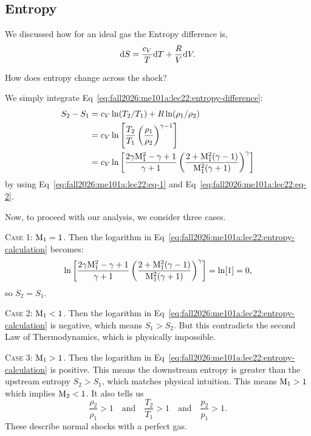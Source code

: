\subsection{Entropy}

\begin{recall}
We discussed how for an ideal gas the Entropy difference is,
\begin{equation}\label{eq:fall2026:me101a:lec22:entropy-difference}
\mathrm{d} S = \frac{c_{V}}{T}\mathrm{d} T + \frac{R}{V}\mathrm{d} V.
\end{equation}
\end{recall}

\begin{puzzle}
How does entropy change across the shock?
\end{puzzle}

\begin{node}
We simply integrate Eq~\eqref{eq:fall2026:me101a:lec22:entropy-difference}:
\begin{subequations}\label{eq:fall2026:me101a:lec22:entropy-calculation}
  \begin{align}
S_{2} - S_{1}
&= c_{V}\ln(T_{2}/T_{1})+R\ln(\rho_{1}/\rho_{2})\\
&= c_{V}\ln\left[\frac{T_{2}}{T_{1}}\left(\frac{\rho_{1}}{\rho_{2}}\right)^{\gamma-1}\right]\\
&= c_{V}\ln\left[\frac{2\gamma\mathrm{M}_{1}^{2}-\gamma+1}{\gamma+1}\left(\frac{2+\mathrm{M}_{1}^{2}(\gamma-1)}{\mathrm{M}_{1}^{2}(\gamma+1)}\right)^{\gamma}\right]
  \end{align}
\end{subequations}
by using Eq~\eqref{eq:fall2026:me101a:lec22:eq-1} and Eq~\eqref{eq:fall2026:me101a:lec22:eq-2}.
\end{node}

\begin{node}
Now, to proceed with our analysis, we consider three cases.

\textsc{Case 1}: $\mathrm{M}_{1}=1$. Then the logarithm in Eq~\eqref{eq:fall2026:me101a:lec22:entropy-calculation}
becomes:
\begin{equation}
\ln\left[\frac{2\gamma\mathrm{M}_{1}^{2}-\gamma+1}{\gamma+1}\left(\frac{2+\mathrm{M}_{1}^{2}(\gamma-1)}{\mathrm{M}_{1}^{2}(\gamma+1)}\right)^{\gamma}\right]=\ln[1]=0,
\end{equation}
so $S_{2}=S_{1}$.

\textsc{Case 2}: $\mathrm{M}_{1}<1$. Then the logarithm in Eq~\eqref{eq:fall2026:me101a:lec22:entropy-calculation}
is negative, which means $S_{1}>S_{2}$. But this contradicts the
second Law of Thermodynamics, which is physically impossible.

\textsc{Case 3}: $\mathrm{M}_{1}>1$. Then the logarithm in Eq~\eqref{eq:fall2026:me101a:lec22:entropy-calculation}
is positive. This means the downstream entropy is greater than the
upstream entropy $S_{2}>S_{1}$, which matches physical intuition. This
means $\mathrm{M}_{1}>1$ which implies $\mathrm{M}_{2}<1$. It also tells us
\begin{equation}
\frac{\rho_{2}}{\rho_{1}}>1\quad\mbox{and}\quad\frac{T_{2}}{T_{1}}>1\quad\mbox{and}\quad\frac{p_{2}}{p_{1}}>1.
\end{equation}
These describe normal shocks with a perfect gas.
\end{node}


